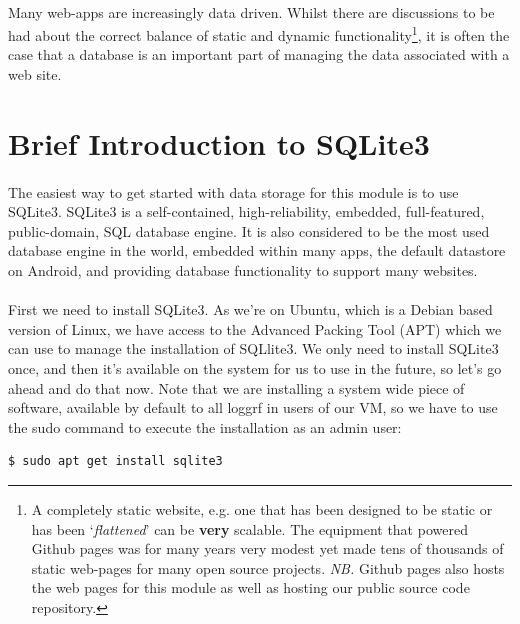 \documentclass[12pt, a4paper, oneside]{book}
\begin{document}
{\paragraph{} Many web-apps are increasingly data driven. Whilst there are discussions to be had about the correct balance of static and dynamic functionality\footnote{A completely static website, e.g. one that has been designed to be static or has been `\emph{flattened}' can be {\bf{very}} scalable. The equipment that powered Github pages was for many years very modest yet made tens of thousands of static web-pages for many open source projects. \emph{NB.} Github pages also hosts the web pages for this module as well as hosting our public source code repository.}, it is often the case that a database is an important part of managing the data associated with a web site.

\section{Brief Introduction to SQLite3}
\label{sqlite3-intro}
\paragraph{} The easiest way to get started with data storage for this module is to use SQLite3. SQLite3 is a self-contained, high-reliability, embedded, full-featured, public-domain, SQL database engine. It is also considered to be the most used database engine in the world, embedded within many apps, the default datastore on Android, and providing database functionality to support many websites.

\paragraph{} First we need to install SQLite3. As we're on Ubuntu, which is a Debian based version of Linux, we have access to the Advanced Packing Tool (APT) which we can use to manage the installation of SQLlite3. We only need to install SQLite3 once, and then it's available on the system for us to use in the future, so let's go ahead and do that now. Note that we are installing a system wide piece of software, available by default to all loggrf in users of our VM, so we have to use the sudo command to execute the installation as an admin user:


\begin{lstlisting}[style=DOS]
    $ sudo apt get install sqlite3
\end{lstlisting}

}
\end{document}

